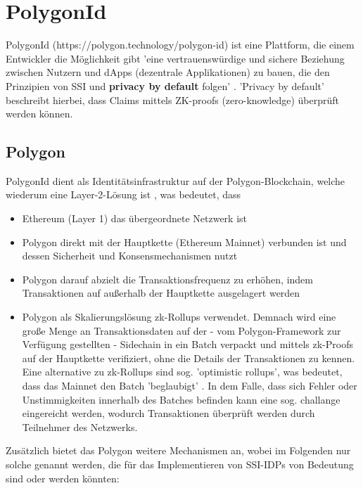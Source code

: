 \section{PolygonId}
PolygonId (https://polygon.technology/polygon-id) ist eine Plattform, die einem Entwickler die Möglichkeit gibt 'eine vertrauenswürdige und sichere Beziehung zwischen Nutzern und dApps (dezentrale Applikationen) zu bauen, die den Prinzipien von SSI und \textbf{privacy by default} folgen' \cite{ID31}.
'Privacy by default' beschreibt hierbei, dass Claims mittels ZK-proofs (zero-knowledge) überprüft werden können. 

\subsection{Polygon}
PolygonId dient als Identitätsinfrastruktur auf der Polygon-Blockchain, welche wiederum eine Layer-2-Lösung ist \cite{ID34}, was bedeutet, dass 
\begin{itemize}
	\item Ethereum (Layer 1) das übergeordnete Netzwerk ist
	\item Polygon direkt mit der Hauptkette (Ethereum Mainnet) verbunden ist und dessen Sicherheit und Konsensmechanismen nutzt
	\item Polygon darauf abzielt die Transaktionsfrequenz zu erhöhen, indem Transaktionen auf außerhalb der Hauptkette ausgelagert werden
	\item Polygon als Skalierungslösung zk-Rollups verwendet. Demnach wird eine große Menge an Transaktionsdaten auf der - vom Polygon-Framework zur Verfügung gestellten - Sidechain in ein Batch verpackt und mittels zk-Proofs auf der Hauptkette verifiziert, ohne die Details der Transaktionen zu kennen. Eine alternative zu zk-Rollups sind sog. 'optimistic rollups', was bedeutet, dass das Mainnet den Batch 'beglaubigt' \cite{ID35}. In dem Falle, dass sich Fehler oder Unstimmigkeiten innerhalb des Batches befinden kann eine sog. challange eingereicht werden, wodurch Transaktionen überprüft werden durch Teilnehmer des Netzwerks.
\end{itemize}
Zusätzlich bietet das Polygon weitere Mechanismen an, wobei im Folgenden nur solche genannt werden, die für das Implementieren von SSI-IDPs von Bedeutung sind oder werden könnten:
